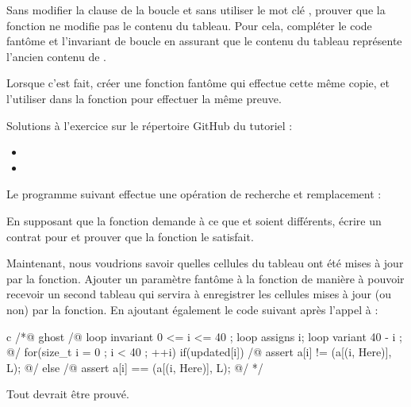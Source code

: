 Sans modifier la clause  de la boucle et sans utiliser le mot
clé , prouver que la fonction ne modifie pas le
contenu du tableau. Pour cela, compléter le code fantôme et l'invariant de boucle
en assurant que le contenu du tableau  représente l'ancien contenu
de .


Lorsque c'est fait, créer une fonction fantôme qui effectue cette même copie, et
l'utiliser dans la fonction  pour effectuer la même preuve.

\begin{Information}
  Solutions à l'exercice sur le répertoire GitHub du tutoriel :
  \begin{itemize}
    \item {}
    \item {}
  \end{itemize}
\end{Information}



Le programme suivant effectue une opération de recherche et remplacement :




En supposant que la fonction  demande à ce que
 et  soient différents, écrire un contrat pour
 et prouver que la fonction le satisfait.


Maintenant, nous voudrions savoir quelles cellules du tableau ont été mises à
jour par la fonction. Ajouter un paramètre fantôme à la fonction
 de manière à pouvoir recevoir un second tableau qui servira
à enregistrer les cellules mises à jour (ou non) par la fonction. En ajoutant
également le code suivant après l'appel à  :


\begin{CodeBlock}{c}
/*@ ghost
  /@ loop invariant 0 <= i <= 40 ;
     loop assigns i;
     loop variant 40 - i ;
  @/
  for(size_t i = 0 ; i < 40 ; ++i){
    if(updated[i]){
      /@ assert a[i] != \at(a[\at(i, Here)], L); @/
    } else {
      /@ assert a[i] == \at(a[\at(i, Here)], L); @/
    }
  }
*/
\end{CodeBlock}


Tout devrait être prouvé.

